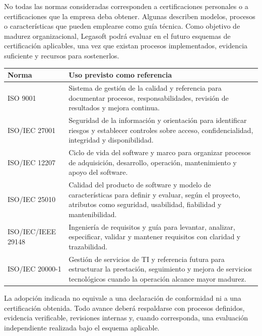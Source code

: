 No todas las normas consideradas corresponden a certificaciones personales o a
certificaciones que la empresa deba obtener. Algunas describen modelos, procesos
o características que pueden emplearse como guía técnica. Como objetivo de
madurez organizacional, Legasoft podrá evaluar en el futuro esquemas de
certificación aplicables, una vez que existan procesos implementados, evidencia
suficiente y recursos para sostenerlos.

\begin{center}
\begin{tabularx}{\linewidth}{@{}L{3.4cm} Y@{}}
\toprule
\sffamily\bfseries\color{lgPrimario}Norma &
\sffamily\bfseries\color{lgPrimario}Uso previsto como referencia \\
\midrule
ISO 9001 & Sistema de gestión de la calidad y referencia para documentar procesos, responsabilidades, revisión de resultados y mejora continua. \\
ISO/IEC 27001 & Seguridad de la información y orientación para identificar riesgos y establecer controles sobre acceso, confidencialidad, integridad y disponibilidad. \\
ISO/IEC 12207 & Ciclo de vida del software y marco para organizar procesos de adquisición, desarrollo, operación, mantenimiento y apoyo del software. \\
ISO/IEC 25010 & Calidad del producto de software y modelo de características para definir y evaluar, según el proyecto, atributos como seguridad, usabilidad, fiabilidad y mantenibilidad. \\
ISO/IEC/IEEE 29148 & Ingeniería de requisitos y guía para levantar, analizar, especificar, validar y mantener requisitos con claridad y trazabilidad. \\
ISO/IEC 20000-1 & Gestión de servicios de TI y referencia futura para estructurar la prestación, seguimiento y mejora de servicios tecnológicos cuando la operación alcance mayor madurez. \\
\bottomrule
\end{tabularx}
\end{center}

\begin{nota}
La adopción indicada no equivale a una declaración de conformidad ni a una
certificación obtenida. Todo avance deberá respaldarse con procesos definidos,
evidencia verificable, revisiones internas y, cuando corresponda, una evaluación
independiente realizada bajo el esquema aplicable.
\end{nota}

